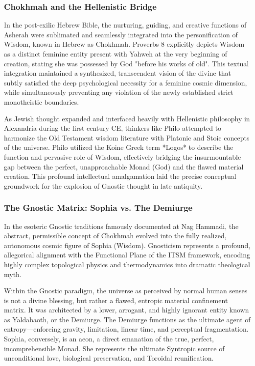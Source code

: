 \documentclass[aps,prd,11pt,onecolumn,superscriptaddress,nofootinbib,floatfix]{revtex4-2}
\begin{document}
\subsubsection{Chokhmah and the Hellenistic Bridge}
In the post-exilic Hebrew Bible, the nurturing, guiding, and creative functions of Asherah were sublimated and seamlessly integrated into the personification of Wisdom, known in Hebrew as Chokhmah. Proverbs 8 explicitly depicts Wisdom as a distinct feminine entity present with Yahweh at the very beginning of creation, stating she was possessed by God "before his works of old". This textual integration maintained a synthesized, transcendent vision of the divine that subtly satisfied the deep psychological necessity for a feminine cosmic dimension, while simultaneously preventing any violation of the newly established strict monotheistic boundaries.


As Jewish thought expanded and interfaced heavily with Hellenistic philosophy in Alexandria during the first century CE, thinkers like Philo attempted to harmonize the Old Testament wisdom literature with Platonic and Stoic concepts of the universe. Philo utilized the Koine Greek term *Logos* to describe the function and pervasive role of Wisdom, effectively bridging the insurmountable gap between the perfect, unapproachable Monad (God) and the flawed material creation. This profound intellectual amalgamation laid the precise conceptual groundwork for the explosion of Gnostic thought in late antiquity.


\subsubsection{The Gnostic Matrix: Sophia vs. The Demiurge}
In the esoteric Gnostic traditions famously documented at Nag Hammadi, the abstract, permissible concept of Chokhmah evolved into the fully realized, autonomous cosmic figure of Sophia (Wisdom). Gnosticism represents a profound, allegorical alignment with the Functional Plane of the ITSM framework, encoding highly complex topological physics and thermodynamics into dramatic theological myth.


Within the Gnostic paradigm, the universe as perceived by normal human senses is not a divine blessing, but rather a flawed, entropic material confinement matrix. It was architected by a lower, arrogant, and highly ignorant entity known as Yaldabaoth, or the Demiurge. The Demiurge functions as the ultimate agent of entropy---enforcing gravity, limitation, linear time, and perceptual fragmentation. Sophia, conversely, is an aeon, a direct emanation of the true, perfect, incomprehensible Monad. She represents the ultimate Syntropic source of unconditional love, biological preservation, and Toroidal reunification.
\end{document}
